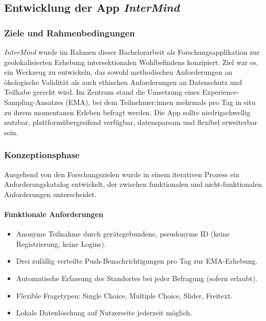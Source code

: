 \subsection{Entwicklung der App \textit{InterMind}}

\subsubsection{Ziele und Rahmenbedingungen}
\textit{InterMind} wurde im Rahmen dieser Bachelorarbeit als Forschungsapplikation zur geolokalisierten Erhebung intersektionalen Wohlbefindens konzipiert. Ziel war es, ein Werkzeug zu entwickeln, das sowohl methodischen Anforderungen an ökologische Validität als auch ethischen Anforderungen an Datenschutz und Teilhabe gerecht wird. Im Zentrum stand die Umsetzung eines Experience-Sampling-Ansatzes (EMA), bei dem Teilnehmer:innen mehrmals pro Tag in situ zu ihrem momentanen Erleben befragt werden. Die App sollte niedrigschwellig nutzbar, plattformübergreifend verfügbar, datensparsam und flexibel erweiterbar sein.


\subsubsection{Konzeptionsphase}
Ausgehend von den Forschungszielen wurde in einem iterativen Prozess ein Anforderungskatalog entwickelt, der zwischen funktionalen und nicht-funktionalen Anforderungen unterscheidet.

\paragraph{Funktionale Anforderungen}
\begin{itemize}
  \item Anonyme Teilnahme durch gerätegebundene, pseudonyme ID (keine Registrierung, keine Logins).
  \item Drei zufällig verteilte Push-Benachrichtigungen pro Tag zur EMA-Erhebung.
  \item Automatische Erfassung des Standortes bei jeder Befragung (sofern erlaubt).
  \item Flexible Fragetypen: Single Choice, Multiple Choice, Slider, Freitext.
  \item Lokale Datenlöschung auf Nutzerseite jederzeit möglich.
\end{itemize}


